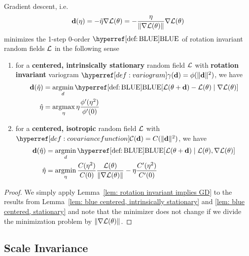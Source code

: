 \begin{theorem}\label{thm: bayesian descent}
	Gradient descent, i.e. 
	\begin{equation*}
		\mathbf{d}(\eta) = - \tilde{\eta} \nabla\mathcal{L}(\theta)
		= - \frac{\eta}{\|\nabla\mathcal{L}(\theta)\|} \nabla\mathcal{L}(\theta)
	\end{equation*}
	minimizes the 1-step 0-order \(\BLUE\) of rotation invariant random fields
	\(\mathcal{L}\) in the following sense
	\begin{enumerate}
		\item for a \textbf{centered, intrinsically stationary} random field
		\(\mathcal{L}\) with \textbf{rotation invariant} variogram \(\variogram(\step) =
		\phi(\|\step\|^2)\), we have
		\begin{align*}
			\step(\hat{\lr})
			&= \argmin_{d}
			\BLUE[\Loss(\param + \step) - \Loss(\param)\mid \nabla\Loss(\param)]\\
			\hat{\lr}
			&= \argmax_{\lr} \lr\frac{\phi'(\lr^2)}{\phi'(0)}
		\end{align*}


		\item for a \textbf{centered, isotropic} random field \(\mathcal{L}\) with
		\(\C(\step)=C(\|\step\|^2)\), we have
		\begin{align*}
			\step(\hat{\lr})
			&= \argmin_{d}
			\BLUE[\Loss(\param + \step)\mid \Loss(\param), \nabla\Loss(\param)]\\
			\hat{\lr}
			&= \argmin_{\lr}\frac{\sqC(\lr^2)}{\sqC(0)} \frac{\Loss(\param)}{\|\nabla\Loss(\param)\|}
		-  \lr\frac{\sqC'(\lr^2)}{\sqC'(0)}
		\end{align*}
	\end{enumerate}
\end{theorem}

\begin{proof}
	We simply apply Lemma~\ref{lem: rotation invariant implies GD}	to the results
	from Lemma~\ref{lem: blue centered, intrinsically stationary} and \ref{lem:
	blue centered, stationary} and note that the minimizer does not change if
	we divide the minimization problem by \(\|\nabla\mathcal{L}(\theta)\|\).
\end{proof}

\subsection{Scale Invariance}

